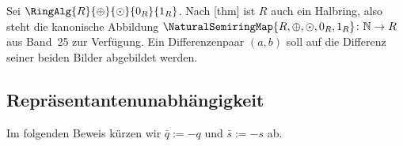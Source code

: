 \documentclass[main.tex]{subfiles}
\begin{document}
Sei \(\RingAlg{R}{\oplus}{\odot}{0_R}{1_R}\). Nach
[thm] ist \(R\) auch ein Halbring,
also steht die kanonische Abbildung
\(\NaturalSemiringMap{R,\oplus,\odot,0_R,1_R}\colon\mathbb N\to R\)
aus Band~25 zur Verfügung. Ein Differenzenpaar \((a,b)\) soll auf die
Differenz seiner beiden Bilder abgebildet werden.

\subsection{Repräsentantenunabhängigkeit}

Im folgenden Beweis kürzen wir
\(\bar q:=-q\) und \(\bar s:=-s\) ab.
\end{document}
